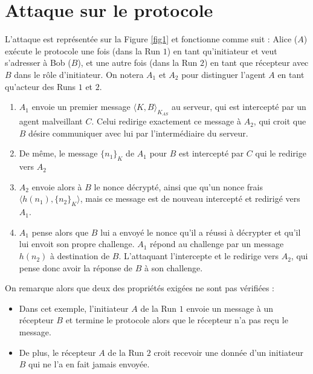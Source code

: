\documentclass[a4paper,10pt]{article}
\begin{document}
\section{Attaque sur le protocole}
L'attaque est représentée sur la Figure \ref{fig1} et fonctionne comme suit : Alice ($A$) exécute le protocole une fois (dans la Run $1$) en tant qu'initiateur et veut s'adresser à Bob ($B$), et une autre fois (dans la Run $2$) en tant que récepteur avec $B$ dans le rôle d'initiateur. On notera $A_1$ et $A_2$ pour distinguer l'agent $A$ en tant qu'acteur des Runs $1$ et $2$.\\
\begin{enumerate}
\item $A_1$ envoie un premier message $\langle K, B\rangle_{K_{AS}}$ au serveur, qui est intercepté par un agent malveillant $C$. Celui redirige exactement ce message à $A_2$, qui croit que $B$ désire communiquer avec lui par l'intermédiaire du serveur.
\item De même, le message $\{n_1\}_K$ de $A_1$ pour $B$ est intercepté par $C$ qui le redirige vers $A_2$
\item $A_2$ envoie alors à $B$ le nonce décrypté, ainsi que qu'un nonce frais $\langle h(n_1) , \{n_2\}_K\rangle$, mais ce message est de nouveau intercepté et redirigé vers $A_1$.
\item $A_1$ pense alors que $B$ lui a envoyé le nonce qu'il a réussi à décrypter et qu'il lui envoit son propre challenge. $A_1$ répond au challenge par un message $h(n_2)$ à destination de $B$. L'attaquant l'intercepte et le redirige vers $A_2$, qui pense donc avoir la réponse de $B$ à son challenge.
\end{enumerate}

On remarque alors que deux des propriétés exigées ne sont pas vérifiées :
\begin{itemize}
\item Dans cet exemple, l'initiateur $A$ de la Run $1$ envoie un message à un récepteur $B$ et termine le protocole alors que le récepteur n'a pas reçu le message.
\item De plus, le récepteur $A$ de la Run $2$ croit recevoir une donnée d'un initiateur $B$ qui ne l'a en fait jamais envoyée.
\end{itemize}



\end{document}
